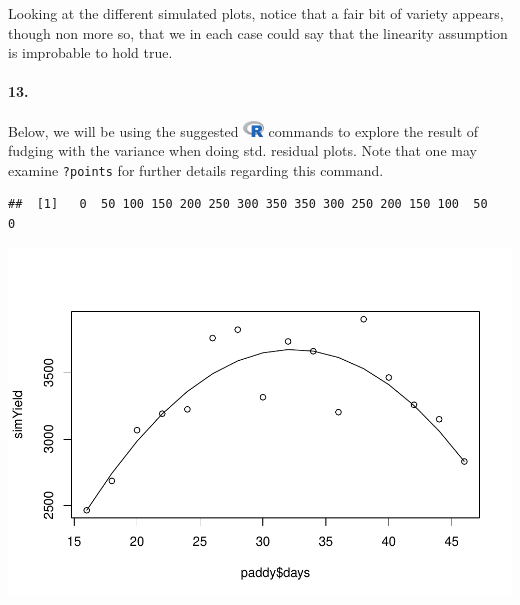 \documentclass[
]{article}
\newenvironment{Shaded}{\begin{snugshade}}{\end{snugshade}}
\newcommand{\DataTypeTok}[1]{\textcolor[rgb]{0.13,0.29,0.53}{#1}}
\newcommand{\DecValTok}[1]{\textcolor[rgb]{0.00,0.00,0.81}{#1}}
\newcommand{\KeywordTok}[1]{\textcolor[rgb]{0.13,0.29,0.53}{\textbf{#1}}}
\newcommand{\NormalTok}[1]{#1}
\newcommand{\OperatorTok}[1]{\textcolor[rgb]{0.81,0.36,0.00}{\textbf{#1}}}
\newcommand{\StringTok}[1]{\textcolor[rgb]{0.31,0.60,0.02}{#1}}
\begin{document}
Looking at the different simulated plots, notice that a fair bit of
variety appears, though non more so, that we in each case could say that
the linearity assumption is improbable to hold true.

\hypertarget{section-62}{%
\paragraph{\texorpdfstring{\textbf{13.}}{13.}}\label{section-62}}

Below, we will be using the suggested
\includegraphics[width=\textwidth,height=0.16667in]{R_logo.png} commands
to explore the result of fudging with the variance when doing std.
residual plots. Note that one may examine \texttt{?points} for further
details regarding this command.

\begin{Shaded}
\end{Shaded}

\begin{verbatim}
##  [1]   0  50 100 150 200 250 300 350 350 300 250 200 150 100  50   0
\end{verbatim}

\begin{Shaded}
\end{Shaded}

\begin{center}\includegraphics{matstatproblems20-21_files/figure-latex/unnamed-chunk-64-1} \end{center}
\end{document}
